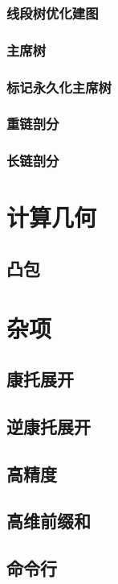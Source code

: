 \subsubsection{线段树优化建图}


\subsubsection{主席树}


\subsubsection{标记永久化主席树}


\subsubsection{重链剖分}


\subsubsection{长链剖分}

\section{计算几何}
\subsection{凸包}


\section{杂项}
\subsection{康托展开}


\subsection{逆康托展开}


\subsection{高精度}


\subsection{高维前缀和}


\subsection{命令行}


